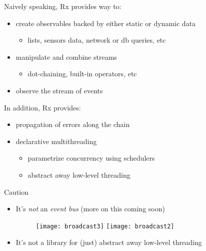 \documentclass[10pt]{beamer}
\begin{document}
\begin{frame}[fragile]
Naively speaking, Rx provides way to:
	\begin{itemize}
		\item create observables backed by either static or dynamic data
			\begin{itemize}
				\item lists, sensors data, network or db queries, etc
			\end{itemize}
		\item manipulate and combine streams 
		\begin{itemize}\item dot-chaining, built-in operators, etc
			\end{itemize}
		\item observe the stream of events 
	\end{itemize}
		In addition, Rx provides: 
	\begin{itemize}
		\item propagation of errors along the chain
		\item declarative multithreading  
			\begin{itemize}
				\item parametrize concurrency using schedulers
				\item abstract away low-level threading
			\end{itemize}
	\end{itemize}
\end{frame}
\begin{frame}[fragile]
	\begin{alertblock}{Caution}
		\begin{itemize}
			\item It's \emph{not} an \emph{event bus} (more on this coming soon)
	\begin{figure}
		\texttt{[image: broadcast3]}
		\hspace{5ex}
		\texttt{[image: broadcast2]}
	\end{figure}
			\item It's not a library for (just) abstract away low-level threading
		\end{itemize}
	\end{alertblock}


\end{frame}
\end{document}
